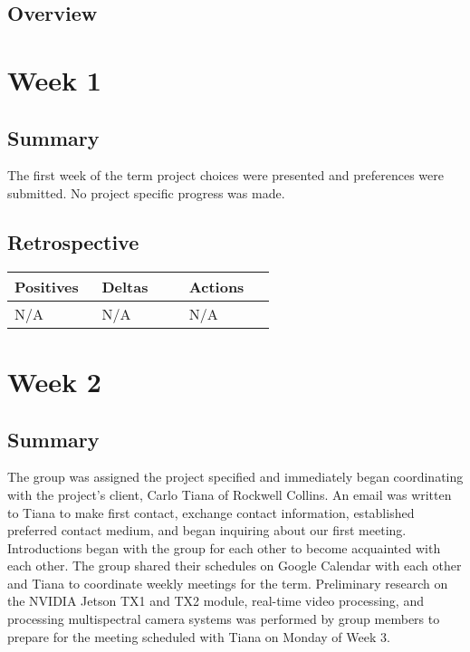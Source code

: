 \documentclass[letterpaper,10pt,serif,draftclsnofoot,onecolumn,compsoc,titlepage]{IEEEtran}
\begin{document}
\subsection{Overview}



\section{Week 1}

\subsection{Summary}

The first week of the term project choices were presented and preferences were
submitted. No project specific progress was made. 

\subsection{Retrospective}

\begin{tabular}{|p{0.3\linewidth}|p{0.3\linewidth}|p{0.3\linewidth}|}
   \hline
   \textbf{Positives} & \textbf{Deltas} & \textbf{Actions}\\ 
   \hline
   N/A 
   & N/A 
   & N/A \\
   \hline
\end{tabular}

\section{Week 2}

\subsection{Summary}

The group was assigned the project specified and immediately began coordinating 
with the project's client, Carlo Tiana of Rockwell Collins. 
An email was written to Tiana to make first contact, exchange contact 
information,
established preferred contact medium, and began inquiring about our first meeting.
Introductions began with the group for each other to become acquainted with 
each other. 
The group shared their schedules on Google Calendar with each other and Tiana 
to coordinate weekly meetings for the term. 
Preliminary research on the NVIDIA Jetson TX1 and TX2 module, real-time video 
processing, and processing multispectral camera systems was performed by group members 
to prepare for the meeting scheduled with Tiana on Monday of Week 3. \\
\end{document}
